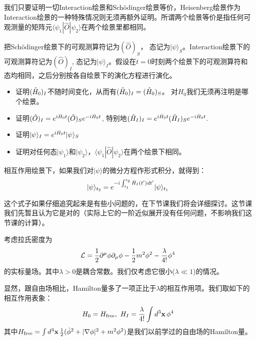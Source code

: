 \documentclass[CJK]{beamer}
\begin{document}
\begin{frame} 
\bch
{\small 
我们只要证明一切Interaction绘景和Sch\"odinger绘景等价，Heisenberg绘景作为Interaction绘景的一种特殊情况则无须再额外证明。所谓两个绘景等价是指任何可观测量的矩阵元$\langle \psi_1 | \hat{O}|\psi_2\rangle$在两个绘景里都相同。
\skipline

把Sch\"odinger绘景下的可观测算符记为$(\hat{O})_S$， 态记为$|\psi\rangle_S$。Interaction绘景下的可观测算符记为$(\hat{O})_I$, 态记为$|\psi\rangle_I$。假设在$t=0$时刻两个绘景下的可观测算符和态均相同，之后分别按各自绘景下的演化方程进行演化。
\begin{itemize}
\item{证明$({\hat{H}}_0)_I$不随时间变化，从而有$({\hat{H}}_0)_I=({\hat{H}}_0)_S$。 对$H_0$我们无须再注明是哪个绘景。}
\item{证明$(\hat{O})_I = e^{{\dot{\imath}}{\hat{H}}_0 t}(\hat{O})_S e^{-{\dot{\imath}}{\hat{H}}_0 t}$, 特别地$({\hat{H}}_I)_I= e^{{\dot{\imath}}{\hat{H}}_0 t}({\hat{H}}_I)_S e^{-{\dot{\imath}}{\hat{H}}_0 t}$.}
\item{证明$|\psi\rangle_I = e^{{\dot{\imath}}{\hat{H}}_0 t} |\psi\rangle_S $}
\item{证明对任何态$|\psi_1\rangle$和$|\psi_2\rangle$，$\langle \psi_1 | \hat{O}|\psi_2\rangle$在两个绘景下相同。}
\end{itemize}
}
\ech
\end{frame}

\begin{frame} 
\bch
相互作用绘景下，如果我们对$|\psi\rangle$的微分方程作形式积分，就得到：
$$|\psi\rangle_{t_2} = e^{-{\dot{\imath}}\int_{t_1}^{t_2} {\hat{H}}_I(t') dt'} |\psi\rangle_{t_1}$$

这个式子如果仔细追究起来是有些小问题的，在下节课我们将会详细探讨。这节课我们先暂且认为它是对的（实际上它的一阶近似展开没有任何问题，不影响我们这节课的计算）。

\ech
\end{frame}


\begin{frame} 
\bch
考虑拉氏密度为
$${\mathcal{L}} = \frac{1}{2}\partial^\mu\phi\partial_\mu\phi - \frac{1}{2}m^2\phi^2 - \frac{\lambda}{4!}\phi^4$$
的实标量场。其中$\lambda>0$是耦合常数。我们仅考虑它很小($\lambda \ll 1$)的情况。

显然，跟自由场相比，Hamilton量多了一项正比于$\lambda$的相互作用项。我们取如下的相互作用表象：
$$ H_0 = H_{\rm free},\ H_I = \frac{\lambda}{4!} \int d^3{\mathbf{x}}\, \phi^4$$
其中$H_{\rm free} = \int d^3{\mathbf{x}}\, \frac{1}{2}(\dot\phi^2 + |\nabla \phi|^2 + m^2\phi^2)$是我们以前学过的自由场的Hamilton量。

\ech
\end{frame}
\end{document}
